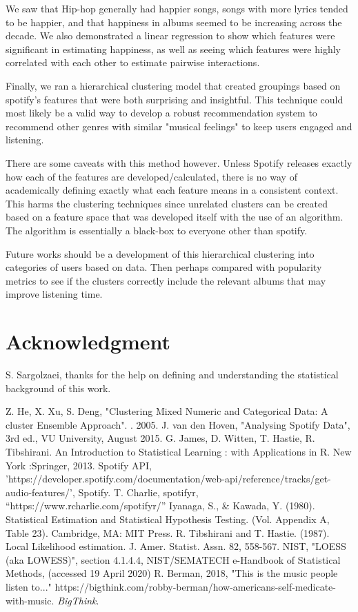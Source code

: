 \documentclass[conference]{IEEEtran}
\begin{document}
We saw that Hip-hop generally had happier songs, songs with more lyrics tended to be happier, and that happiness in albums seemed to be increasing across the decade. We also demonstrated a linear regression to show which features were significant in estimating happiness, as well as seeing which features were highly correlated with each other to estimate pairwise interactions.

Finally, we ran a hierarchical clustering model that created groupings based on spotify's features that were both surprising and insightful. This technique could most likely be a valid way to develop a robust recommendation system to recommend other genres with similar "musical feelings" to keep users engaged and listening. 

There are some caveats with this method however. Unless Spotify releases exactly how each of the features are developed/calculated, there is no way of academically defining exactly what each feature means in a consistent context. This harms the clustering techniques since unrelated clusters can be created based on a feature space that was developed itself with the use of an algorithm. The algorithm is essentially a black-box to everyone other than spotify. 

Future works should be a development of this hierarchical clustering into categories of users based on data. Then perhaps compared with popularity metrics to see if the clusters correctly include the relevant albums that may improve listening time. 

\section*{Acknowledgment}

S. Sargolzaei, thanks for the help on defining and understanding the statistical background of this work. 

\begin{thebibliography}{00}
 Z. He, X. Xu, S. Deng, "Clustering Mixed Numeric and Categorical Data: A cluster Ensemble Approach". . 2005.
 J. van den Hoven, "Analysing Spotify Data", 3rd ed., VU University, August 2015.
 G. James, D. Witten, T. Hastie, R. Tibshirani. An Introduction to Statistical Learning : with Applications in R. New York :Springer, 2013.
 Spotify API,  'https://developer.spotify.com/documentation/web-api/reference/tracks/get-audio-features/', Spotify.
 T. Charlie, spotifyr, ``https://www.rcharlie.com/spotifyr/'' 
 Iyanaga, S., \& Kawada, Y. (1980). Statistical Estimation and Statistical Hypothesis
Testing. (Vol. Appendix A, Table 23). Cambridge, MA: MIT Press.
 R. Tibshirani and T. Hastie. (1987). Local Likelihood estimation. J. Amer. Statist. Assn. 82, 558-567.
 NIST, "LOESS (aka LOWESS)", section 4.1.4.4, NIST/SEMATECH e-Handbook of Statistical Methods, (accessed 19 April 2020)
 R. Berman, 2018, "This is the music people listen to..." https://bigthink.com/robby-berman/how-americans-self-medicate-with-music. \textit{BigThink}. 
\end{thebibliography}
\end{document}
